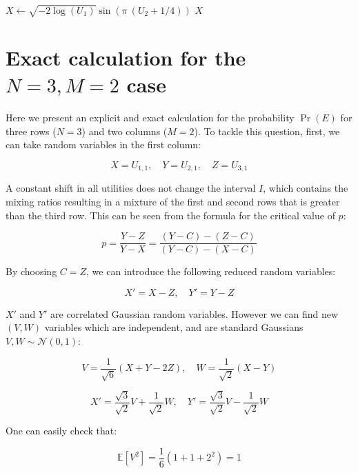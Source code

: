 \documentclass{article}
\theoremstyle{definition}
\begin{document}
\begin{appendices}
\begin{algorithm}[H]
\begin{algorithmic}[1]
\State $X \gets \sqrt{-2 \log(U_1)} \sin(\pi \ (U_2 + 1/4))$
\State \Return $X$
\end{algorithmic}
\end{algorithm}

\section{Exact calculation for the $N=3, M=2$ case}

Here we present an explicit and exact calculation for the probability $\Pr(E)$ for three rows ($N=3$) and two columns ($M=2$).
To tackle this question, first, we can take random variables in the first column:

\begin{equation}
    X = U_{1,1}, \quad Y = U_{2,1}, \quad Z = U_{3,1}
\end{equation}

A constant shift in all utilities does not change the interval $I$, which contains the mixing ratios resulting in a mixture of the first and second rows that is greater than the third row.
This can be seen from the formula for the critical value of $p$:

\begin{equation}
    p = \frac{Y-Z}{Y-X}  = \frac{(Y-C)-(Z-C)}{(Y-C)-(X-C)}
\end{equation}

By choosing $C=Z$, we can introduce the following reduced random variables:

\begin{equation}
    X' = X - Z, \quad Y'=Y - Z
\end{equation}

$X'$ and $Y'$ are correlated Gaussian random variables. However we can find new $(V,W)$ variables which are independent, and are standard Gaussians $V,W \sim \mathcal{N}(0,1)$:


\begin{equation}
    V = \frac{1}{\sqrt{6}}(X + Y - 2 Z), \quad
    W = \frac{1}{\sqrt{2}} (X - Y)
\end{equation}

\begin{equation}
    X' = \frac{\sqrt{3}}{\sqrt{2}} V + \frac{1}{\sqrt{2}} W, \quad
    Y' = \frac{\sqrt{3}}{\sqrt{2}} V - \frac{1}{\sqrt{2}} W
\end{equation}

One can easily check that:

\begin{equation}
    \mathbb{E}[V^2] = \frac{1}{6} (1 + 1 + 2^2) = 1
\end{equation}


\end{appendices}
\end{document}
